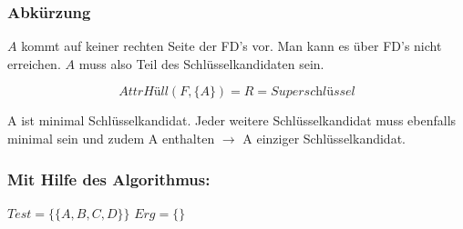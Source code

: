 \documentclass{lehramt-informatik}
\begin{document}
%

\subsubsection{Abkürzung}

$A$ kommt auf keiner rechten Seite der FD’s vor.
Man kann es über FD's nicht erreichen. $A$ muss also Teil des
Schlüsselkandidaten sein.

\begin{equation*}
\textit{AttrHüll}(F, \{A\}) = R = \textit{Superschlüssel}
\end{equation*}

A ist minimal Schlüsselkandidat.
%
Jeder weitere Schlüsselkandidat muss ebenfalls minimal sein und zudem
A enthalten $\rightarrow$ A einziger Schlüsselkandidat.

%

\subsubsection{Mit Hilfe des Algorithmus:}

$Test = \{\{A, B, C, D\}\}$ $Erg = \{\}$
\end{document}
